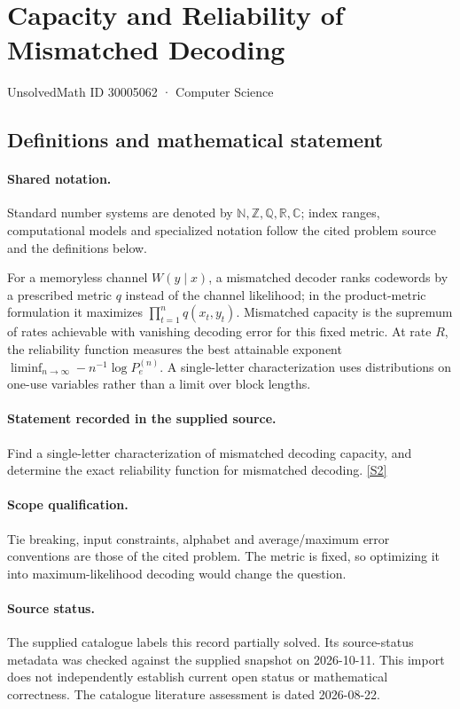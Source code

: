 \documentclass[11pt]{article}
\newcommand{\sref}[2]{\hyperlink{source:#1:#2}{[S#2]}}
\begin{document}
\setcounter{section}{30005061}
\section{Capacity and Reliability of Mismatched Decoding}\label{30005062}
{\small\sffamily UnsolvedMath ID 30005062 · Computer Science}
\subsection{Definitions and mathematical statement}

\paragraph{Shared notation.}Standard number systems are denoted by $\mathbb N,\mathbb Z,\mathbb Q,\mathbb R,\mathbb C$; index ranges, computational models and specialized notation follow the cited problem source and the definitions below.


For a memoryless channel $W(y\mid x)$, a mismatched decoder ranks codewords by a prescribed metric $q$ instead of the channel likelihood; in the product-metric formulation it maximizes $\prod_{t=1}^n q(x_t,y_t)$. Mismatched capacity is the supremum of rates achievable with vanishing decoding error for this fixed metric. At rate $R$, the reliability function measures the best attainable exponent $\liminf_{n\to\infty}-n^{-1}\log P_e^{(n)}$. A single-letter characterization uses distributions on one-use variables rather than a limit over block lengths.
\paragraph{Statement recorded in the supplied source.}
Find a single-letter characterization of mismatched decoding capacity, and determine the exact reliability function for mismatched decoding. \sref{30005062}{2}
\paragraph{Scope qualification.}
Tie breaking, input constraints, alphabet and average/maximum error conventions are those of the cited problem. The metric is fixed, so optimizing it into maximum-likelihood decoding would change the question.
\paragraph{Source status.}
The supplied catalogue labels this record partially solved. Its source-status metadata was checked against the supplied snapshot on 2026-10-11. This import does not independently establish current open status or mathematical correctness. The catalogue literature assessment is dated 2026-08-22.
\end{document}
